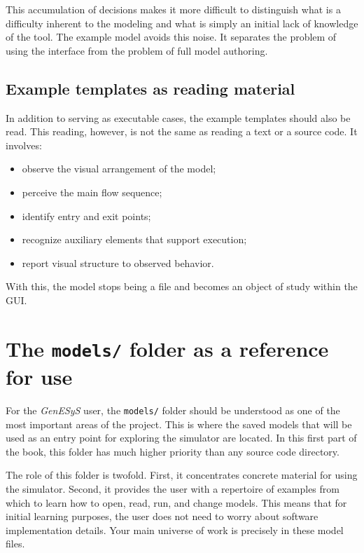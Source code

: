This accumulation of decisions makes it more difficult to distinguish what is a difficulty inherent to the modeling and what is simply an initial lack of knowledge of the tool. The example model avoids this noise. It separates the problem of using the interface from the problem of full model authoring.

\subsection{Example templates as reading material}
\label{subsec:cap4_modelos_exemplo_como_leitura}

In addition to serving as executable cases, the example templates should also be read. This reading, however, is not the same as reading a text or a source code. It involves:
\begin{itemize}
\item observe the visual arrangement of the model;
\item perceive the main flow sequence;
\item identify entry and exit points;
\item recognize auxiliary elements that support execution;
\item report visual structure to observed behavior.
\end{itemize}

With this, the model stops being a file and becomes an object of study within the GUI.

\section{The \texttt{models/} folder as a reference for use}
\label{sec:cap4_pasta_models_referencia}

For the \textit{GenESyS} user, the \texttt{models/} folder should be understood as one of the most important areas of the project. This is where the saved models that will be used as an entry point for exploring the simulator are located. In this first part of the book, this folder has much higher priority than any source code directory.

The role of this folder is twofold. First, it concentrates concrete material for using the simulator. Second, it provides the user with a repertoire of examples from which to learn how to open, read, run, and change models. This means that for initial learning purposes, the user does not need to worry about software implementation details. Your main universe of work is precisely in these model files.

